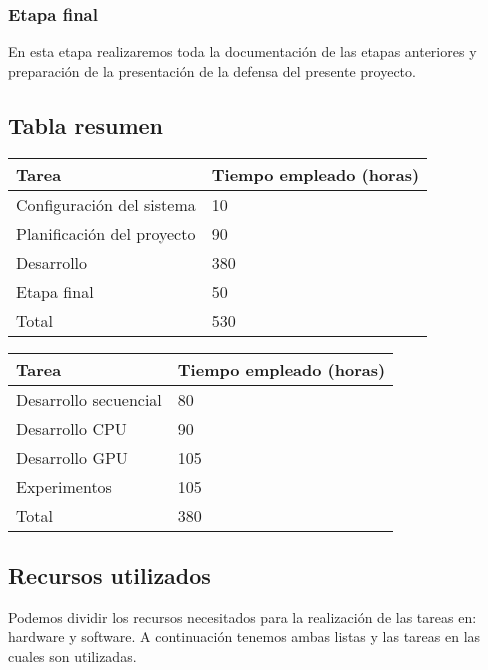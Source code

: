 \documentclass[titlepage,12pt]{report}
\begin{document}
\subsubsection{Etapa final}

En esta etapa realizaremos toda la documentación de las etapas anteriores y preparación de la presentación de la defensa del presente proyecto.

\subsection{Tabla resumen}

\begin{table}
	\centering
	\begin{tabular}{|m{5cm}||m{5cm}|}
		\hline
		Tarea & Tiempo empleado (horas) \\ \hline \hline
		Configuración del sistema & 10 \\ \hline
		Planificación del proyecto & 90 \\ \hline
		Desarrollo & 380 \\ \hline
		Etapa final & 50 \\ \hline \hline
		Total & 530 \\ \hline
	\end{tabular}
\end{table}

\begin{table}
	\centering
	\begin{tabular}{|m{5cm}||m{5cm}|}
		\hline
		Tarea & Tiempo empleado (horas) \\ \hline \hline
		Desarrollo secuencial & 80 \\ \hline
		Desarrollo CPU & 90 \\ \hline
		Desarrollo GPU & 105 \\ \hline
		Experimentos & 105 \\ \hline \hline
		Total & 380 \\ \hline
	\end{tabular}
\end{table}

\subsection{Recursos utilizados}

Podemos dividir los recursos necesitados para la realización de las tareas en: hardware y software. A continuación tenemos ambas listas y las tareas en las cuales son utilizadas.
\end{document}
